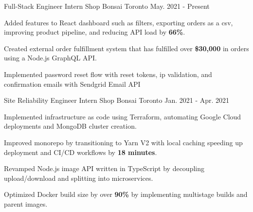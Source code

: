 

\begin{cventries}

  \cventry
    {Full-Stack Engineer Intern} %
    {Shop Bonsai} %
    {Toronto} %
    {May. 2021 - Present} %
    {
      \begin{cvitems} %
        \item {Added features to React dashboard such as filters, exporting orders as a csv, improving product pipeline, and reducing API load by \textbf{66\%}.}
        \item {Created external order fulfillment system that has fulfilled over \textbf{\$30,000} in orders using a Node.js GraphQL API.}
        \item {Implemented password reset flow with reset tokens, ip validation, and confirmation emails with Sendgrid Email API}
      \end{cvitems}
    }
    
  \cventry
    {Site Reliability Engineer Intern} %
    {Shop Bonsai} %
    {Toronto} %
    {Jan. 2021 - Apr. 2021} %
    {
      \begin{cvitems} %
        \item {Implemented infrastructure as code using Terraform, automating Google Cloud deployments and MongoDB cluster creation.}
        \item {Improved monorepo by transitioning to Yarn V2 with local caching speeding up deployment and CI/CD workflows by \textbf{18 minutes}.}
        \item {Revamped Node.js image API written in TypeScript by decoupling upload/download and splitting into microservices.}
        \item {Optimized Docker build size by over \textbf{90\%} by implementing multistage builds and parent images.}
      \end{cvitems}
    }
    
\end{cventries}
